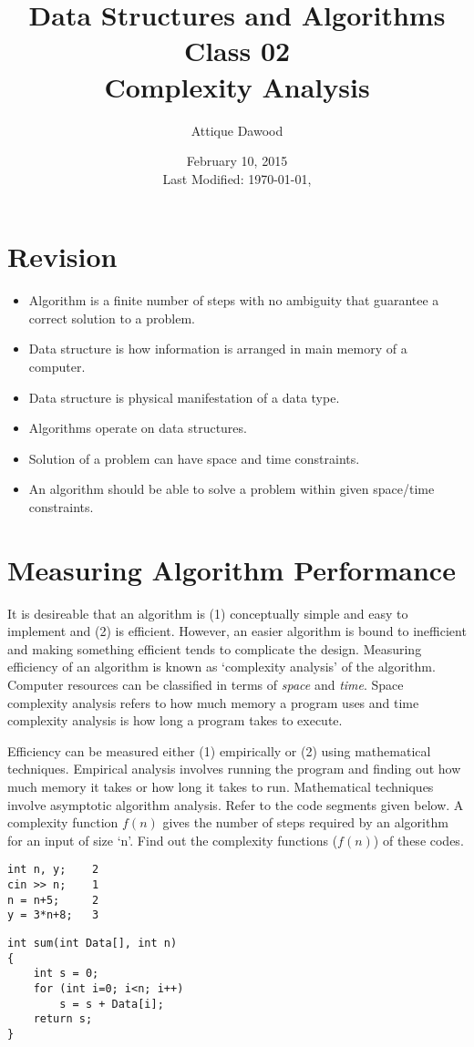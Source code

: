 \documentclass[12pt,a4paper]{article}
\title{Data Structures and Algorithms\\Class 02\\Complexity Analysis}
\author{Attique Dawood}
\date{February 10, 2015\\[0.2cm] Last Modified: \today, \currenttime}
\begin{document}
\maketitle
\section{Revision}
\begin{itemize}
\item Algorithm is a finite number of steps with no ambiguity that guarantee a correct solution to a problem.
\item Data structure is how information is arranged in main memory of a computer.
\item Data structure is physical manifestation of a data type.
\item Algorithms operate on data structures.
\item Solution of a problem can have space and time constraints.
\item An algorithm should be able to solve a problem within given space/time constraints.
\end{itemize}
\section{Measuring Algorithm Performance}
It is desireable that an algorithm is (1) conceptually simple and easy to implement and (2) is efficient. However, an easier algorithm is bound to inefficient and making something efficient tends to complicate the design. Measuring efficiency of an algorithm is known as `complexity analysis' of the algorithm. Computer resources can be classified in terms of \textit{space} and \textit{time}. Space complexity analysis refers to how much memory a program uses and time complexity analysis is how long a program takes to execute.

Efficiency can be measured either (1) empirically or (2) using mathematical techniques. Empirical analysis involves running the program and finding out how much memory it takes or how long it takes to run. Mathematical techniques involve asymptotic algorithm analysis. Refer to the code segments given below. A complexity function $f(n)$ gives the number of steps required by an algorithm for an input of size `n'. Find out the complexity functions ($f(n)$) of these codes.
\begin{lstlisting}
int n, y;    2
cin >> n;    1
n = n+5;     2
y = 3*n+8;   3
\end{lstlisting}
\begin{lstlisting}
int sum(int Data[], int n)
{
    int s = 0;
    for (int i=0; i<n; i++)
        s = s + Data[i];
    return s;
}
\end{lstlisting}
\end{document}

